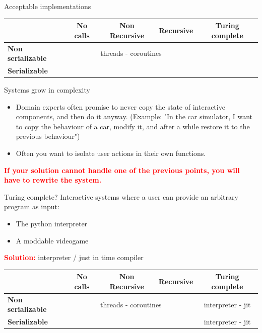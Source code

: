 \documentclass[aspectratio=169,11pt]{beamer}
\begin{document}
\begin{frame}{Acceptable implementations}
\renewcommand{\arraystretch}{1.3} %
\setlength{\tabcolsep}{3pt}       %


\begin{tabularx}{\textwidth}{l|c|c|c|c}
\hline
 & \textbf{No calls}
 & \textbf{Non Recursive}
 & \textbf{Recursive}
 & \textbf{Turing complete} \\
\hline
    \textbf{Non serializable}       &  \multicolumn{3}{|c|}{threads - coroutines }   \\
\hline
\textbf{Serializable}        &  &  &  &   \\
\hline
\end{tabularx}
\end{frame}

\begin{frame}{Systems grow in complexity}
    \begin{itemize}
        \item Domain experts often promise to never copy the state of interactive components, and then do it anyway. (Example: "In the car simulator, I want to copy the behaviour of a car, modify it, and after a while restore it to the previous behaviour")
        \item Often you want to isolate user actions in their own functions. 
    \end{itemize}

    \textbf{\textcolor{red}{If your solution cannot handle one of the previous points, you will have to rewrite the system.}}

\end{frame}

\begin{frame}{Turing complete?}
Interactive systems where a user can provide an arbitrary program as input:
\begin{itemize}
    \item The python interpreter
    \item A moddable videogame 
\end{itemize}

\textbf{\textcolor{red} {Solution:}} interpreter / just in time compiler
\renewcommand{\arraystretch}{1.3} %
\setlength{\tabcolsep}{3pt}       %


\begin{tabularx}{\textwidth}{l|c|c|c|c}
\hline
 & \textbf{No calls}
 & \textbf{Non Recursive}
 & \textbf{Recursive}
 & \textbf{Turing complete} \\
\hline
    \textbf{Non serializable}       &  \multicolumn{3}{|c|}{threads - coroutines } & interpreter  - jit \\
\hline
\textbf{Serializable}        &  &  &  &  interpreter - jit\\
\hline
\end{tabularx}
\end{frame}
\end{document}

